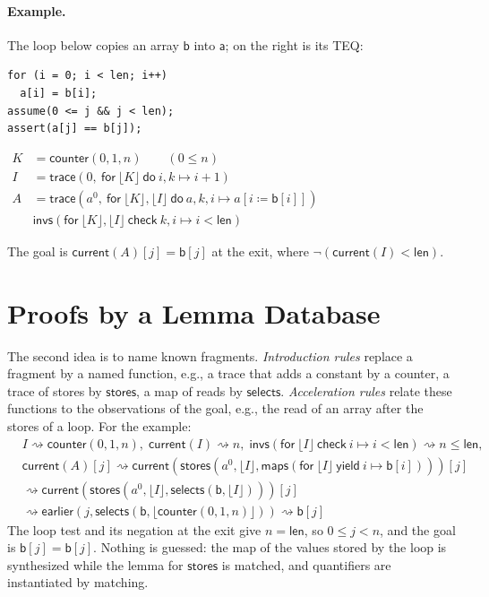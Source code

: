 \documentclass[english]{lni}
\newcommand{\code}[1]{\mathsf{#1}}
\newcommand{\butlast}[1]{\lfloor #1 \rfloor}
\newcommand{\TRACE}[4]{\code{trace}(#1,\ \code{for}\ #2\ \code{do}\ #3 \mapsto #4)}
\newcommand{\MAPS}[3]{\code{maps}(\code{for}\ #1\ \code{yield}\ #2 \mapsto #3)}
\newcommand{\INVS}[3]{\code{invs}(\code{for}\ #1\ \code{check}\ #2 \mapsto #3)}
\newcommand{\rewrites}{\rightsquigarrow}
\begin{document}
\paragraph{Example.} The loop below copies an array $\code{b}$ into $\code{a}$; on the right is its TEQ:

\noindent
\begin{minipage}[c]{0.36\textwidth}
\begin{lstlisting}
for (i = 0; i < len; i++)
  a[i] = b[i];
assume(0 <= j && j < len);
assert(a[j] == b[j]);
\end{lstlisting}
\end{minipage}
\hfill
\begin{minipage}[c]{0.62\textwidth}
$\begin{aligned}
K &= \code{counter}(0, 1, n) \qquad (0 \le n) \\
I &= \TRACE{0}{\butlast{K}}{i, k}{i + 1} \\
A &= \TRACE{a^0}{\butlast{K}, \butlast{I}}{a, k, i}{a[i \coloneqq \code{b}[i]]} \\
& \INVS{\butlast{K}, \butlast{I}}{k, i}{i < \code{len}}
\end{aligned}$
\end{minipage}

\smallskip
\noindent
The goal is $\code{current}(A)[j] = \code{b}[j]$ at the exit, where $\neg(\code{current}(I) < \code{len})$.

\section{Proofs by a Lemma Database}

The second idea is to name known fragments. \emph{Introduction rules} replace a fragment by a named function, e.g., a
trace that adds a constant by a counter, a trace of stores by $\code{stores}$, a map of reads by $\code{selects}$.
\emph{Acceleration rules} relate these functions to the observations of the goal, e.g., the read of an array after the
stores of a loop. For the example:
\begin{align*}
& I \rewrites \code{counter}(0, 1, n),\;
  \code{current}(I) \rewrites n,\;
  \INVS{\butlast{I}}{i}{i < \code{len}} \rewrites n \le \code{len}, \\[2pt]
& \code{current}(A)[j]
  \rewrites \code{current}(\code{stores}(a^0, \butlast{I}, \MAPS{\butlast{I}}{i}{\code{b}[i]}))[j] \\
& \rewrites \code{current}(\code{stores}(a^0, \butlast{I}, \code{selects}(\code{b}, \butlast{I})))[j] \\
& \rewrites \code{earlier}(j, \code{selects}(\code{b}, \butlast{\code{counter}(0, 1, n)}))
  \rewrites \code{b}[j]
\end{align*}
The loop test and its negation at the exit give $n = \code{len}$, so $0 \le j < n$, and the goal is
$\code{b}[j] = \code{b}[j]$. Nothing is guessed: the map of the values stored by the loop is synthesized while the
lemma for $\code{stores}$ is matched, and quantifiers are instantiated by matching.
\end{document}
